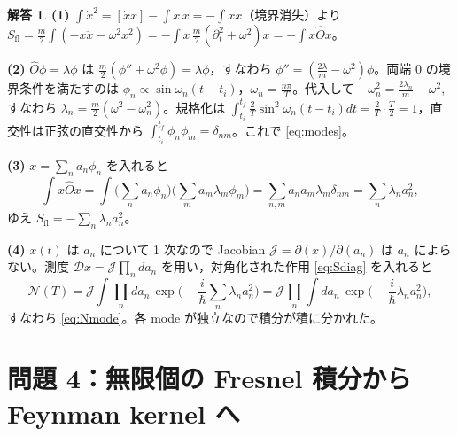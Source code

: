 \documentclass[dvipdfmx, uplatex]{jsarticle}
\theoremstyle{definition}
\newtheorem*{sol}{解答}
\begin{document}
\begin{sol}
\textbf{(1)} $\int\dot x^2=[\dot x x]-\int\ddot x\,x=-\int x\ddot x$（境界消失）より
$S_{\text{fl}}=\frac{m}{2}\int(-x\ddot x-\omega^2x^2)=-\int x\,\frac{m}{2}(\partial_t^2+\omega^2)x=-\int x\hat O x$。

\par\smallskip
\textbf{(2)} $\hat O\phi=\lambda\phi$ は $\frac{m}{2}(\phi''+\omega^2\phi)=\lambda\phi$，すなわち
$\phi''=(\frac{2\lambda}{m}-\omega^2)\phi$。両端 $0$ の境界条件を満たすのは
$\phi_n\propto\sin\omega_n(t-t_i)$，$\omega_n=\frac{n\pi}{T}$。代入して $-\omega_n^2=\frac{2\lambda_n}{m}-\omega^2$,
すなわち $\lambda_n=\frac{m}{2}(\omega^2-\omega_n^2)$。規格化は
$\int_{t_i}^{t_f}\frac{2}{T}\sin^2\omega_n(t-t_i)dt=\frac{2}{T}\cdot\frac{T}{2}=1$，直交性は正弦の直交性から
$\int_{t_i}^{t_f}\phi_n\phi_m=\delta_{nm}$。これで \eqref{eq:modes}。

\par\smallskip
\textbf{(3)} $x=\sum_n a_n\phi_n$ を入れると
\[
    \int x\hat O x
    =\int\Big(\sum_n a_n\phi_n\Big)\Big(\sum_m a_m\lambda_m\phi_m\Big)
    =\sum_{n,m}a_na_m\lambda_m\delta_{nm}=\sum_n\lambda_n a_n^2,
\]
ゆえ $S_{\text{fl}}=-\sum_n\lambda_n a_n^2$。

\par\smallskip
\textbf{(4)} $x(t)$ は $a_n$ について 1 次なので Jacobian $\mathcal{J}=\partial(x)/\partial(a_n)$ は
$a_n$ によらない。測度 $\mathcal{D}x=\mathcal{J}\prod_n da_n$ を用い，対角化された作用 \eqref{eq:Sdiag} を入れると
\[
    \mathcal{N}(T)
    =\mathcal{J}\int\prod_n da_n\,\exp\!\Big(-\frac{i}{\hbar}\sum_n\lambda_n a_n^2\Big)
    =\mathcal{J}\prod_n\int da_n\,\exp\!\Big(-\frac{i}{\hbar}\lambda_n a_n^2\Big),
\]
すなわち \eqref{eq:Nmode}。各 mode が独立なので積分が積に分かれた。
\end{sol}

\section{問題 4：無限個の Fresnel 積分から Feynman kernel へ}
\end{document}
